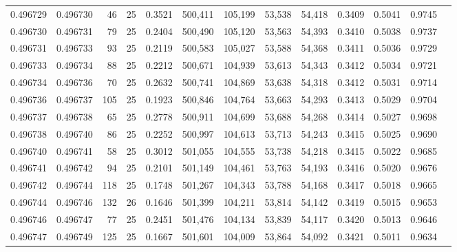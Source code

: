 \begin{tabular}{rrrrrrrrrrrrr}
0.496729 & 0.496730 &    46 &  25 &                                     0.3521 & 500,411 & 105,199 &  53,538 &  54,418 & 0.3409 & 0.5041 & 0.9745 \\
0.496730 & 0.496731 &    79 &  25 &                                     0.2404 & 500,490 & 105,120 &  53,563 &  54,393 & 0.3410 & 0.5038 & 0.9737 \\
0.496731 & 0.496733 &    93 &  25 &                                     0.2119 & 500,583 & 105,027 &  53,588 &  54,368 & 0.3411 & 0.5036 & 0.9729 \\
0.496733 & 0.496734 &    88 &  25 &                                     0.2212 & 500,671 & 104,939 &  53,613 &  54,343 & 0.3412 & 0.5034 & 0.9721 \\
0.496734 & 0.496736 &    70 &  25 &                                     0.2632 & 500,741 & 104,869 &  53,638 &  54,318 & 0.3412 & 0.5031 & 0.9714 \\
0.496736 & 0.496737 &   105 &  25 &                                     0.1923 & 500,846 & 104,764 &  53,663 &  54,293 & 0.3413 & 0.5029 & 0.9704 \\
0.496737 & 0.496738 &    65 &  25 &                                     0.2778 & 500,911 & 104,699 &  53,688 &  54,268 & 0.3414 & 0.5027 & 0.9698 \\
0.496738 & 0.496740 &    86 &  25 &                                     0.2252 & 500,997 & 104,613 &  53,713 &  54,243 & 0.3415 & 0.5025 & 0.9690 \\
0.496740 & 0.496741 &    58 &  25 &                                     0.3012 & 501,055 & 104,555 &  53,738 &  54,218 & 0.3415 & 0.5022 & 0.9685 \\
0.496741 & 0.496742 &    94 &  25 &                                     0.2101 & 501,149 & 104,461 &  53,763 &  54,193 & 0.3416 & 0.5020 & 0.9676 \\
0.496742 & 0.496744 &   118 &  25 &                                     0.1748 & 501,267 & 104,343 &  53,788 &  54,168 & 0.3417 & 0.5018 & 0.9665 \\
0.496744 & 0.496746 &   132 &  26 &                                     0.1646 & 501,399 & 104,211 &  53,814 &  54,142 & 0.3419 & 0.5015 & 0.9653 \\
0.496746 & 0.496747 &    77 &  25 &                                     0.2451 & 501,476 & 104,134 &  53,839 &  54,117 & 0.3420 & 0.5013 & 0.9646 \\
0.496747 & 0.496749 &   125 &  25 &                                     0.1667 & 501,601 & 104,009 &  53,864 &  54,092 & 0.3421 & 0.5011 & 0.9634 \\

\end{tabular}
